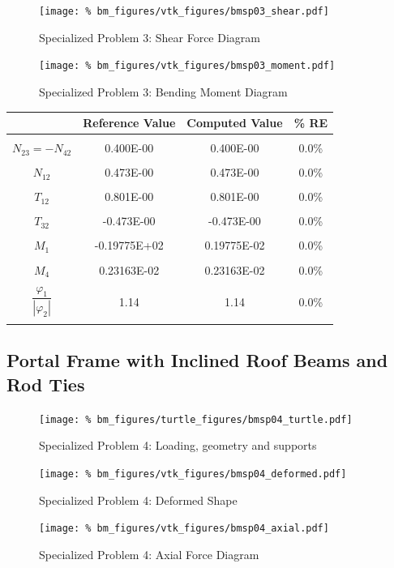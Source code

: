 \begin{figure}[!htb]
    \texttt{[image: \%
                     bm\_figures/vtk\_figures/bmsp03\_shear.pdf]}
    \centering
    \caption{Specialized Problem 3: Shear Force Diagram}
    \label{fig:bmsp03_shear}
\end{figure}
\begin{figure}[!htb]
    \texttt{[image: \%
                     bm\_figures/vtk\_figures/bmsp03\_moment.pdf]}
    \centering
    \caption{Specialized Problem 3: Bending Moment Diagram}
    \label{fig:bmsp03_moment}
\end{figure}
\begin{table}[h!]
\centering
\begin{tabular}{ c| c c c }
    & Reference Value & Computed Value & \% RE \\ \hline \\
    $N_{23}=-N_{42}$  & 0.400E-00 & 0.400E-00 & 0.0\% \\ \\
    $N_{12}$          & 0.473E-00 & 0.473E-00 & 0.0\% \\ \\
    $T_{12}$          & 0.801E-00 & 0.801E-00 & 0.0\% \\ \\
    $T_{32}$          & -0.473E-00 & -0.473E-00 & 0.0\% \\ \\
    $M_{1}$           & -0.19775E+02 & 0.19775E-02 & 0.0\% \\ \\
    $M_{4}$           & 0.23163E-02 & 0.23163E-02 & 0.0\% \\ \\
    $\dfrac{\varphi_1}{|\varphi_2|}$ & 1.14 & 1.14 & 0.0\% \\ \\
\end{tabular}
\end{table}

%
%
\subsection{Portal Frame with Inclined Roof Beams and Rod Ties}
\begin{figure}[h]
    \texttt{[image: \%
                            bm\_figures/turtle\_figures/bmsp04\_turtle.pdf]}
    \centering
    \caption{Specialized Problem 4: Loading, geometry and supports}
    \label{fig:bmsp01_turtle}
\end{figure}


\begin{figure}[!htb]
    \texttt{[image: \%
                     bm\_figures/vtk\_figures/bmsp04\_deformed.pdf]}
    \centering
    \caption{Specialized Problem 4: Deformed Shape}
    \label{fig:bmsp04_deformed}
\end{figure}
\begin{figure}[!htb]
    \texttt{[image: \%
                     bm\_figures/vtk\_figures/bmsp04\_axial.pdf]}
    \centering
    \caption{Specialized Problem 4: Axial Force Diagram}
    \label{fig:bmsp04_shear}
\end{figure}

